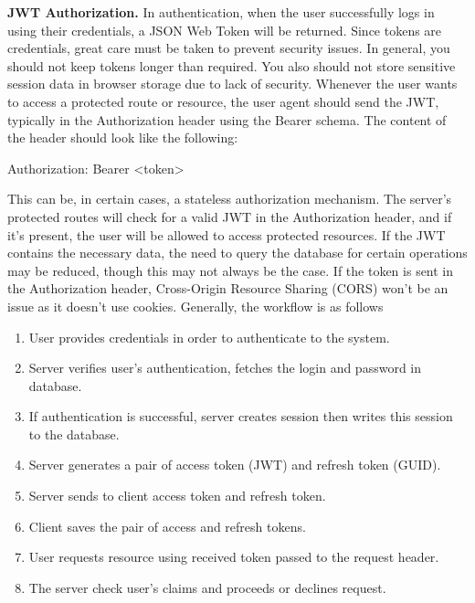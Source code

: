 \textbf{JWT Authorization.} In authentication, when the user successfully logs in using their credentials,
a JSON Web Token will be returned.
Since tokens are credentials, great care must be taken to prevent security issues.
In general, you should not keep tokens longer than required.
You also should not store sensitive session data in browser storage due to lack of security.
Whenever the user wants to access a protected route or resource, the user agent should send the JWT,
typically in the Authorization header using the Bearer schema.
The content of the header should look like the following:
\begin{spverbatim}

    Authorization: Bearer <token>

\end{spverbatim}
This can be, in certain cases, a stateless authorization mechanism.
The server's protected routes will check for a valid JWT in the Authorization header, and if it's present,
the user will be allowed to access protected resources.
If the JWT contains the necessary data, the need to query the database for certain operations may be reduced,
though this may not always be the case.
If the token is sent in the Authorization header, Cross-Origin Resource Sharing (CORS) won't be an issue
as it doesn't use cookies.
Generally, the workflow is as follows
\begin{enumerate}
    \item User provides credentials in order to authenticate to the system.
    \item Server verifies user's authentication, fetches the login and password in database.
    \item If authentication is successful, server creates session then writes this session to the database.
    \item Server generates a pair of access token (JWT) and refresh token (GUID).
    \item Server sends to client access token and refresh token.
    \item Client saves the pair of access and refresh tokens.
    \item User requests resource using received token passed to the request header.
    \item The server check user's claims and proceeds or declines request.
\end{enumerate}

